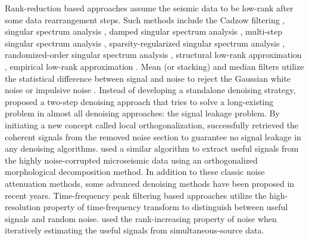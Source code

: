 Rank-reduction based approaches assume the seismic data to be low-rank after some data rearrangement steps. Such methods include the Cadzow filtering \cite[]{trickett2008}, singular spectrum analysis \cite[]{vautard1992singular,mssa,jianjun2013,jinkun2015}, damped  singular spectrum analysis \cite[]{weilin2015,weilin2016,yangkang2016irr5d,yangkang2016irr3d,amir2017grsl}, multi-step singular spectrum analysis \cite[]{zhangdong2016cseg,zhangdong2016}, sparsity-regularized singular spectrum analysis \cite[]{zhangdong2016eage,zhangdong2016seg,amir2016,amir2017ieee,zhangdong2017}, randomized-order singular spectrum analysis \cite[]{weilin2017}, structural low-rank approximation \cite[]{yatong2017ieee}, empirical low-rank approximation \cite[]{yangkang2017ieee}. Mean (or stacking) and median filters utilize the statistical difference between signal and noise to reject the Gaussian white noise or impulsive noise \cite[]{liuyang2009tvmf,yike2013,xieqian2015eage2,wencheng2015stack,shuwei2016,jianyong2017,chenwei2017mf}.  Instead of developing a standalone denoising strategy, \cite{yangkang2015ortho} proposed a two-step denoising approach that tries to solve a long-existing problem in almost all denoising approaches: the signal leakage problem. By initiating a new concept called local orthogonalization, \cite{yangkang2015ortho} successfully retrieved the coherent signals from the removed noise section to guarantee no signal leakage in any denoising algorithms. \cite{weilin2017sr} used a similar algorithm to extract useful signals from the highly noise-corrupted microseismic data using an orthogonalized morphological decomposition method. In addition to these classic noise attenuation methods, some advanced denoising methods have been proposed in recent years. Time-frequency peak filtering \cite[]{kahoo2009,lin2013} based approaches utilize the high-resolution property of time-frequency transform to distinguish between useful signals and random noise. \cite{yaru2016dblend} used the rank-increasing property of noise when iteratively estimating the useful signals from simultaneous-source data.

